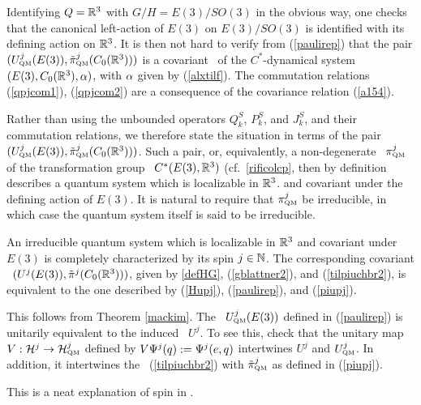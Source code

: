 Identifying $Q={\Bbb R}^3$ with $G/H=E(3)/SO(3)$ in the obvious way, one checks
that the canonical left-action of $E(3)$ on $E(3)/SO(3)$ is identified
with its defining action on ${\Bbb R}^3$.
It is then not hard to verify from (\ref{paulirep}) that
the pair $(U^j_{\mbox{\tiny QM}}(E(3)), \tilde{\pi}^j_{\mbox{\tiny QM}}(C_0({\Bbb R}^3)))$ is a 
covariant \rep\ of the $C^*$-dynamical system $(E(3), C_0({\Bbb R}^3),\alpha)$, with
$\alpha$ given by (\ref{alxtilf}). 
The commutation relations (\ref{qpjcom1}), (\ref{qpjcom2})  
are a consequence of the
covariance relation (\ref{a154}).

Rather than using the unbounded operators $Q^S_k$, $P^S_k$, and $J^S_k$,
and their commutation relations, we therefore state the situation
in terms of the pair $(U^j_{\mbox{\tiny QM}}(E(3)),\tilde{\pi}^j_{\mbox{\tiny QM}}(C_0({\Bbb R}^3)))$.
Such a pair, or, equivalently, a non-degenerate
\rep\ $\pi^j_{\mbox{\tiny QM}}$ of the transformation group
\ca\ $C^*(E(3),{\Bbb R}^3)$ (cf.\ \ref{rificolcp}, then 
by definition describes
 a quantum system which is localizable in ${\Bbb R}^3$.
and covariant under the defining
action of $E(3)$. 
It is natural to require that $\pi^j_{\mbox{\tiny QM}}$
be irreducible, in which case the quantum system itself is said to be
irreducible.
\begin{Proposition}
An irreducible quantum system which is localizable in ${\Bbb R}^3$ and
covariant under $E(3)$ is completely characterized by its spin
$j\in{\Bbb N}$.  The corresponding covariant \rep\
$(U^j(E(3)),\tilde{\pi}^j(C_0({\Bbb R}^3)))$, given by \ref{defHG},
(\ref{gblattner2}), and (\ref{tilpiuchbr2}),
 is equivalent to the one described by
(\ref{Hupj}), (\ref{paulirep}), and (\ref{piupj}).
\end{Proposition}

This follows from Theorem \ref{mackim}.
The  \rep\ $U^j_{\mbox{\tiny QM}}(E(3))$ defined in (\ref{paulirep}) is unitarily equivalent
to the induced \rep\ $U^j$. To see this, check that the unitary map
$V:{\cal H}^j\rightarrow{\cal H}^j_{\mbox{\tiny QM}}$ defined by $V\Psi^j(q):=\Psi^j(e,q)$ intertwines
$U^j$ and $U^j_{\mbox{\tiny QM}}$. In addition, it intertwines the \rep\ (\ref{tilpiuchbr2}) with
$\tilde{\pi}^j_{\mbox{\tiny QM}}$ as defined in (\ref{piupj}).
\enp

This is a neat explanation of spin in \qm.  

